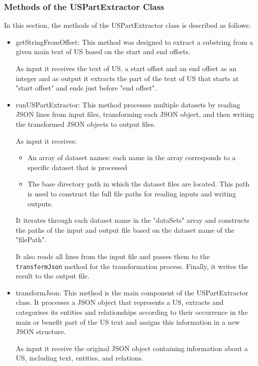 \subsubsection*{Methods of the USPartExtractor Class}
In this section, the methods of the USPartExtractor class is described as follows:
\begin{itemize}
	
	\item getStringFromOffset: This method was designed to extract a substring from a given main text of US based on the start and end offsets.
	
	As input it receives the text of US, a start offset and an end offset as an integer and as output it extracts the part of the text of US that starts at "start offset" and ends just before "end offset".
	
	\item runUSPartExtractor: This method processes multiple datasets by reading JSON lines from input files, transforming each JSON object, and then writing the transformed JSON objects to output files.
	
	As input it receives:
	\begin{itemize}
		\item An array of dataset names: each name in the array corresponds to a specific dataset that is processed
		
		\item The base directory path in which the dataset files are located. This path is used to construct the full file paths for reading inputs and writing outputs.
	\end{itemize}	
	It iterates through each dataset name in the "dataSets" array and constructs the paths of the input and output file based on the dataset name of the "filePath".
	
	It also reads all lines from the input file and passes them to the \texttt{transformJson} method for the transformation process. Finally, it writes the result to the output file.
	
	\item transformJson: This method is the main component of the USPartExtractor class. It processes a JSON object that represents a US, extracts and categorises its entities and relationships according to their occurrence in the main or benefit part of the US text and assigns this information in a new JSON structure.
	
	As input it receive the original JSON object containing information about a US, including text, entities, and relations.
	

\end{itemize}
